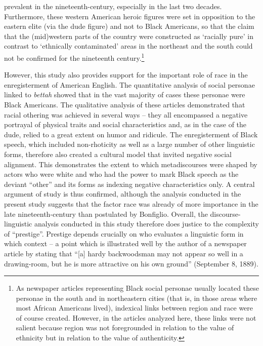 prevalent in the nineteenth-century, especially in the last two decades. Furthermore, these western American heroic figures were set in opposition to the eastern elite (via the dude figure) and not to Black Americans, so that the claim that the (mid)western parts of the country were constructed as ‘racially pure’ in contrast to ‘ethnically contaminated’ areas in the northeast and the south could not be confirmed for the nineteenth century.\footnote{As newspaper articles representing Black social personae usually located these personae in the south and in northeastern cities (that is, in those areas where most African Americans lived), indexical links between region and race were of course created. However, in the articles analyzed here, these links were not salient because region was not foregrounded in relation to the value of ethnicity but in relation to the value of authenticity.}

However, this study also provides support for the important role of race in the enregisterment of American English. The quantitative analysis of social personae linked to \emph{bettah} showed that in the vast majority of cases these personae were Black Americans. The qualitative analysis of these articles demonstrated that racial othering was achieved in several ways – they all encompassed a negative portrayal of physical traits and social characteristics and, as in the case of the dude, relied to a great extent on humor and ridicule. The enregisterment of Black speech, which included non-rhoticity as well as a large number of other linguistic forms, therefore also created a cultural model that invited negative social alignment. This demonstrates the extent to which metadiscourses were shaped by actors who were white and who had the power to mark Black speech as the deviant “other” and its forms as indexing negative characteristics only. A central argument of  study is thus confirmed, although the analysis conducted in the present study suggests that the factor race was already of more importance in the late nineteenth-century than postulated by Bonfiglio. Overall, the discourse-linguistic analysis conducted in this study therefore does justice to the complexity of “prestige”. Prestige depends crucially on who evaluates a linguistic form in which context – a point which is illustrated well by the author of a newspaper article by stating that “[a] hardy backwoodsman may not appear so well in a drawing-room, but he is more attractive on his own ground” (September 8, 1889).


